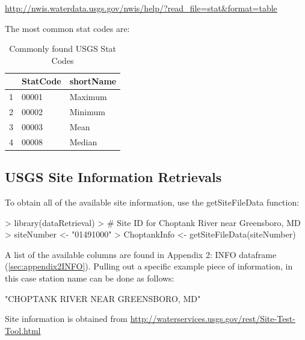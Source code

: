 \documentclass[a4paper,11pt]{article}
\begin{document}
\url{http://nwis.waterdata.usgs.gov/nwis/help/?read_file=stat&format=table}

The most common stat codes are:
\begin{table}[ht]
\begin{center}
\caption{Commonly found USGS Stat Codes}
\begin{tabular}{rll}
  \hline
 & StatCode & shortName \\ 
  \hline
1 & 00001 & Maximum \\ 
  2 & 00002 & Minimum \\ 
  3 & 00003 & Mean \\ 
  4 & 00008 & Median \\ 
   \hline
\end{tabular}
\end{center}
\end{table}

\subsection{USGS Site Information Retrievals}
\label{sec:usgsSite}
To obtain all of the available site information, use the getSiteFileData function:
\begin{Schunk}
\begin{Sinput}
> library(dataRetrieval)
> # Site ID for Choptank River near Greensboro, MD
> siteNumber <- "01491000" 
> ChoptankInfo <- getSiteFileData(siteNumber)
\end{Sinput}
\end{Schunk}

A list of the available columns are found in Appendix 2: INFO dataframe (\ref{sec:appendix2INFO}). Pulling out a specific example piece of information, in this case station name can be done as follows:

\begin{Schunk}
\begin{Soutput}
[1] "CHOPTANK RIVER NEAR GREENSBORO, MD"
\end{Soutput}
\end{Schunk}
Site information is obtained from \url{http://waterservices.usgs.gov/rest/Site-Test-Tool.html}
\end{document}

